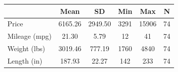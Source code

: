 \begin{tabular}{l*{5}{c}}
\doublerule
                &     Mean&       SD&      Min&      Max&        N\\
\midrule
Price           &  6165.26&  2949.50&     3291&    15906&       74\\
Mileage (mpg)   &    21.30&     5.79&       12&       41&       74\\
Weight (lbs)    &  3019.46&   777.19&     1760&     4840&       74\\
Length (in)     &   187.93&    22.27&      142&      233&       74\\
\midrule
\end{tabular}

